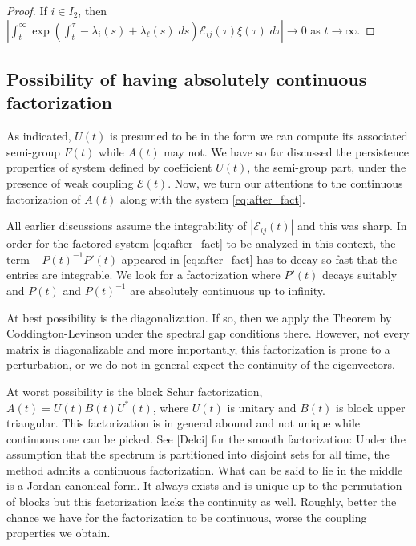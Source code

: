 \documentclass[a4paper,11pt]{article}
\def\red{\color{red}}
\newtheorem{proposition}{Proposition}[section]
\theoremstyle{remark}
\begin{document}
\begin{proof}
If $i\in I_2$, then $\left|\int_t^\infty \exp\left(\int_t^\tau -\lambda_i(s)+\lambda_\ell(s) \; ds\right)\mathcal{E}_{ij}(\tau)\xi(\tau) \; d\tau\right| \rightarrow 0$ as $t \rightarrow \infty$.
\end{proof}

\subsection{Possibility of having absolutely continuous factorization}
As indicated, $U(t)$ is presumed to be in the form we can compute its associated semi-group $F(t)$ while $A(t)$ may not. We have so far discussed the persistence properties of system defined by coefficient $U(t)$, the semi-group part, under the presence of weak coupling $\mathcal{E}(t)$.  Now, we turn our attentions to the continuous factorization of $A(t)$ along with the system \eqref{eq:after_fact}.

All earlier discussions assume the integrability of $|\mathcal{E}_{ij}(t)|$ and this was sharp. In order for the factored system \eqref{eq:after_fact} to be analyzed in this context, the term $-P(t)^{-1}P'(t)$ appeared in \eqref{eq:after_fact} has to decay so fast that the entries are integrable. We look for a factorization where $P'(t)$ decays suitably and $P(t)$ and $P(t)^{-1}$ are absolutely continuous up to infinity.

At best possibility is the diagonalization. If so, then we apply the Theorem by Coddington-Levinson under the spectral gap conditions there. However, not every matrix is diagonalizable and more importantly, this factorization is prone to a perturbation, or we do not in general expect the continuity of the eigenvectors. 

At worst possibility is the block Schur factorization, $A(t)=U(t)B(t)U^*(t)$, where $U(t)$ is unitary and $B(t)$ is block upper triangular. This factorization is in general abound and not unique while continuous one can be picked. See [Delci] for the smooth factorization: Under the assumption that the spectrum is partitioned into disjoint sets for all time, the method admits a continuous factorization. What can be said to lie in the middle is a Jordan canonical form. It always exists and is unique up to the permutation of blocks but this factorization lacks the continuity as well. Roughly, better the chance we have for the factorization to be continuous, worse the coupling properties we obtain.


\cite{L1966}
\end{document}
